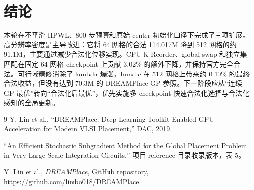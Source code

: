 \documentclass[11pt,a4paper]{ctexart}
\begin{document}
\section{结论}

本轮在不平滑 HPWL、800 步预算和原始 center 初始化口径下完成了三项扩展。高分辨率密度是主导改进：它将 64 网格的合法 114.017M 降到 512 网格的约 91.1M，主要通过减少合法化位移实现。CPU K-Reorder、global swap 和独立集匹配在固定 64 网格 checkpoint 上贡献 3.02\% 的额外下降，并保持官方完全合法。可行域精修消除了 lambda 爆涨，bundle 在 512 网格上带来约 0.10\% 的最终合法收益，但没有达到 70.3M 的 DREAMPlace GP 参照。下一阶段应从“连续 GP 最优”转向“合法化后最优”，优先实施多 checkpoint 快速合法化选择与合法化感知的全局更新。

\begin{thebibliography}{9}
Y. Lin et al., ``DREAMPlace: Deep Learning Toolkit-Enabled GPU Acceleration for Modern VLSI Placement,'' DAC, 2019.

``An Efficient Stochastic Subgradient Method for the Global Placement Problem in Very Large-Scale Integration Circuits,'' 项目 reference 目录收录版本，表 5。

Y. Lin et al., \emph{DREAMPlace}, GitHub repository, \url{https://github.com/limbo018/DREAMPlace}.
\end{thebibliography}
\end{document}
